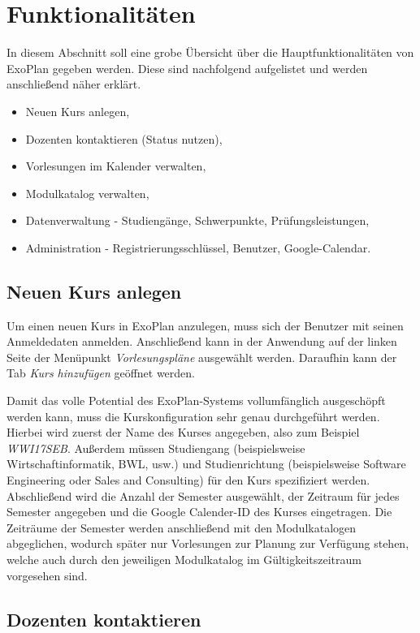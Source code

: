 \section{Funktionalitäten}
In diesem Abschnitt soll eine grobe Übersicht über die Hauptfunktionalitäten von ExoPlan gegeben werden. 
Diese sind nachfolgend aufgelistet und werden anschließend näher erklärt.

\begin{itemize}
	\item Neuen Kurs anlegen,
	\item Dozenten kontaktieren (Status nutzen),
	\item Vorlesungen im Kalender verwalten,
	\item Modulkatalog verwalten,
	\item Datenverwaltung - Studiengänge, Schwerpunkte, Prüfungsleistungen,
	\item Administration - Registrierungsschlüssel, Benutzer, Google-Calendar.
\end{itemize}

\subsection{Neuen Kurs anlegen}

Um einen neuen Kurs in ExoPlan anzulegen, muss sich der Benutzer mit seinen Anmeldedaten anmelden. 
Anschließend kann in der Anwendung auf der linken Seite der Menüpunkt \textit{Vorlesungspläne} ausgewählt werden. 
Daraufhin kann der Tab \textit{Kurs hinzufügen} geöffnet werden.

Damit das volle Potential des ExoPlan-Systems vollumfänglich ausgeschöpft werden kann, muss die Kurskonfiguration sehr genau durchgeführt werden. 
Hierbei wird zuerst der Name des Kurses angegeben, also zum Beispiel \textit{WWI17SEB}. 
Außerdem müssen Studiengang (beispielsweise Wirtschaftinformatik, BWL, usw.) und Studienrichtung (beispielsweise Software Engineering oder Sales and Consulting) für den Kurs spezifiziert werden. 
Abschließend wird die Anzahl der Semester ausgewählt, der Zeitraum für jedes Semester angegeben und die Google Calender-ID des Kurses eingetragen. 
Die Zeiträume der Semester werden anschließend mit den Modulkatalogen abgeglichen, wodurch später nur Vorlesungen zur Planung zur Verfügung stehen, welche auch durch den jeweiligen Modulkatalog im Gültigkeitszeitraum vorgesehen sind.

\subsection{Dozenten kontaktieren}

